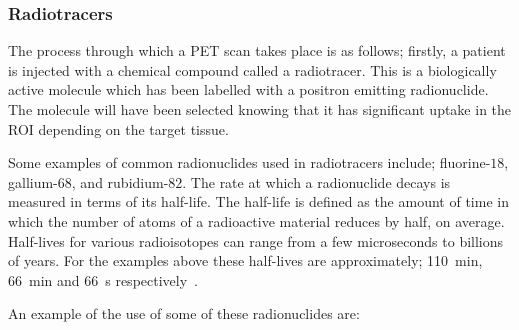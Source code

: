             \subsubsection{Radiotracers} \label{sec:radiotracers}
                The process through which a \gls{PET} scan takes place is as follows; firstly, a patient is injected with a chemical compound called a radiotracer. This is a biologically active molecule which has been labelled with a positron emitting radionuclide. The molecule will have been selected knowing that it has significant uptake in the \gls{ROI} depending on the target tissue. %
                
                Some examples of common radionuclides used in radiotracers include; fluorine-$18$, gallium-$68$, and rubidium-$82$. %
                The rate at which a radionuclide decays is measured in terms of its half-life. The half-life is defined as the amount of time in which the number of atoms of a radioactive material reduces by half, on average. Half-lives for various radioisotopes can range from a few microseconds to billions of years. For the examples above these half-lives are approximately; \SI{110}{\minute}, \SI{66}{\minute} and \SI{66}{\second} respectively~. %
                
                An example of the use of some of these radionuclides are:
                
